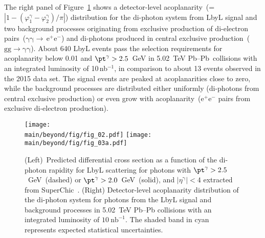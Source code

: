 The right panel of Figure~\ref{fig:lbyl} shows a detector-level  acoplanarity~(=$|1-(\varphi^{\mathrm{\gamma}}_1-\varphi^{\mathrm{\gamma}}_2)/\pi|$) distribution for the di-photon system from LbyL signal and two background processes originating from exclusive production of di-electron pairs~($\mathrm{\gamma\gamma\rightarrow\,e^+e^-}$) and di-photons produced in central exclusive production~($\mathrm{gg\rightarrow \gamma\gamma}$). 
About 640 LbyL events pass the selection requirements for acoplanarity below 0.01 and 
$\pt^{\mathrm{\gamma}}>2.5$~GeV in 5.02~TeV Pb--Pb~collisions with an integrated luminosity of 10\,nb$^{-1}$, in comparison to about 13 events observed in the 2015 data set. 
The signal events are peaked at acoplanarities close to zero, while the background processes are distributed either uniformly (di-photons from central exclusive production) or even grow with acoplanarity~($\mathrm{e^+e^-}$ pairs from exclusive di-electron production). 

\begin{figure}[!hbt]
\centering
\texttt{[image: \\main/beyond/fig/fig\_02.pdf]}
\texttt{[image: \\main/beyond/fig/fig\_03a.pdf]}
\caption{
(Left)~Predicted differential cross section as a function of the di-photon rapidity for LbyL scattering for photons with
$\pt^{\mathrm{\gamma}}>2.5$~GeV~(dashed) or $\pt^{\mathrm{\gamma}}>2.0$~GeV~(solid), and
$|\eta^{\mathrm{\gamma}}|<4$ extracted from SuperChic~\cite{Harland-Lang:2018iur}.
(Right) Detector-level acoplanarity distribution of the di-photon system for photons from the LbyL signal and background processes in
  5.02~TeV Pb--Pb collisions with an integrated luminosity of
  $10~\mathrm{nb}^{-1}$. The shaded band in cyan represents expected statistical uncertainties.
}
\label{fig:lbyl}
\end{figure}

